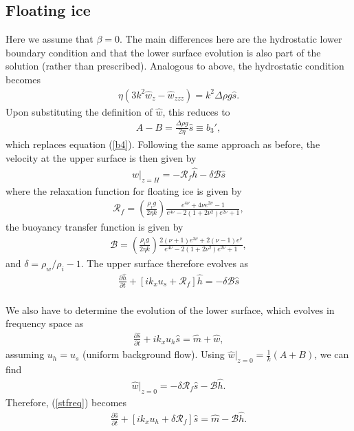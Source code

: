 \documentclass[paper=a4, fontsize=11pt]{article}
\begin{document}
\subsection*{Floating ice}
Here we assume that $\beta=0$.
The main differences here are the hydrostatic lower boundary condition
and that the lower surface evolution is also part of the solution (rather than prescribed).
Analogous to above, the hydrostatic condition becomes
\begin{align}
\eta (3k^2 \widehat{w}_{z}-\widehat{w}_{zzz})  = k^2 \Delta\rho g \widehat{s}. \label{b4alt}
\end{align}
Upon substituting the definition of $\widehat{w}$, this reduces to
\begin{align}
A-B = \frac{\Delta \rho g}{2\eta}\widehat{s}\equiv b_3',
\end{align}
which replaces equation (\ref{b4}).
Following the same approach as before, the velocity at the upper surface is then given by
\begin{align}
w|_{z=H} =  -\mathcal{R}_f\widehat{h} - \delta\mathcal{B}\widehat{s}
\end{align}
where the relaxation function for floating ice is given by
\begin{align}
\mathcal{R}_f = \left(\frac{\rho_i g}{2\eta k}\right) \frac{e^{4\nu} +4\nu e^{2\nu} -1 }{e^{4\nu} -2(1+2\nu^2)e^{2\nu} +1},
\end{align}
the buoyancy transfer function is given by
\begin{align}
\mathcal{B} = \left(\frac{\rho_i g}{2\eta k}\right) \frac{ 2(\nu+1)e^{3\nu}+2(\nu-1)e^{\nu} }{e^{4\nu} -2(1+2\nu^2)e^{2\nu} +1},
\end{align}
and $\delta = \rho_w/\rho_i -1$.
The upper surface therefore evolves as
\begin{align}
\frac{\partial \widehat{h}}{\partial t}+ \left[ik_x u_s  + \mathcal{R}_f\right]\widehat{h} = -\delta\mathcal{B}\widehat{s}
\end{align}
\\ We also have to determine the evolution of the lower surface, which evolves in frequency space as
\begin{align}
\frac{\partial \widehat{s}}{\partial t}+ ik_x u_h \widehat{s} = \widehat{m} + \widehat{w}, \label{stfreq}
\end{align}
assuming $u_h=u_s$ (uniform background flow).
Using $\widehat{w}|_{z=0}= \frac{1}{k}(A+B)$, we can find
\begin{align}
\widehat{w}|_{z=0} = -\delta\mathcal{R}_f\widehat{s} - \mathcal{B} \widehat{h}.
\end{align}
Therefore, (\ref{stfreq}) becomes
\begin{align}
\frac{\partial \widehat{s}}{\partial t}+ [ik_xu_h + \delta\mathcal{R}_f]\widehat{s} = \widehat{m} - \mathcal{B} \widehat{h}.
\end{align}
\end{document}
